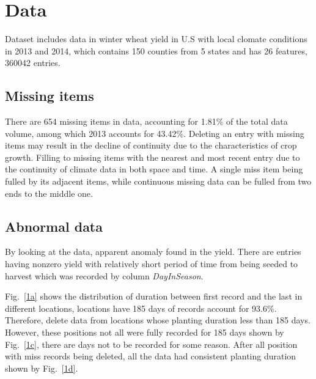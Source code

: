 \documentclass[conference]{IEEEtran}
\begin{document}
\section{Data} \label{sec:data}
  Dataset includes data in winter wheat yield in U.S with local clomate conditions in 2013 and 2014, which contains 150 counties from 5 states and has 26 features, 360042 entries.

\subsection{Missing items}
  There are 654 missing items in data, accounting for 1.81\% of the total data volume, among which 2013 accounts for 43.42\%. Deleting an entry with missing items may result in the decline of continuity due to the characteristics of crop growth. Filling to missing items with the nearest and most recent entry due to the continuity of climate data in both space and time. A single miss item being fulled by its adjacent items, while continuous missing data can be fulled from two ends to the middle one.

\subsection{Abnormal data}
  By looking at the data, apparent anomaly found in the yield. There are entries having nonzero yield with relatively short period of time from being seeded to harvest which was recorded by column \textit{DayInSeason}. 

  Fig.~\ref{1a} shows the distribution of duration between first record and the last in different locations, locations have 185 days of records account for  93.6\%. Therefore, delete data from locations whose planting duration less than 185 days. However, these positions not all were fully recorded for 185 days shown by Fig.~\ref{1c}, there are days not to be recorded for some reason. After all position with miss records being deleted, all the data had consistent planting duration shown by Fig.~\ref{1d}.
\end{document}
